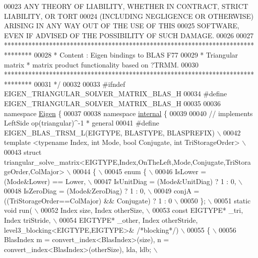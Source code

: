 \begin{DoxyCode}
00023 \textcolor{comment}{ ANY THEORY OF LIABILITY, WHETHER IN CONTRACT, STRICT LIABILITY, OR TORT}
00024 \textcolor{comment}{ (INCLUDING NEGLIGENCE OR OTHERWISE) ARISING IN ANY WAY OUT OF THE USE OF THIS}
00025 \textcolor{comment}{ SOFTWARE, EVEN IF ADVISED OF THE POSSIBILITY OF SUCH DAMAGE.}
00026 \textcolor{comment}{}
00027 \textcolor{comment}{ ********************************************************************************}
00028 \textcolor{comment}{ *   Content : Eigen bindings to BLAS F77}
00029 \textcolor{comment}{ *   Triangular matrix * matrix product functionality based on ?TRMM.}
00030 \textcolor{comment}{ ********************************************************************************}
00031 \textcolor{comment}{*/}
00032 
00033 \textcolor{preprocessor}{#ifndef EIGEN\_TRIANGULAR\_SOLVER\_MATRIX\_BLAS\_H}
00034 \textcolor{preprocessor}{#define EIGEN\_TRIANGULAR\_SOLVER\_MATRIX\_BLAS\_H}
00035 
00036 \textcolor{keyword}{namespace }\hyperlink{namespace_eigen}{Eigen} \{
00037 
00038 \textcolor{keyword}{namespace }\hyperlink{namespaceinternal}{internal} \{
00039 
00040 \textcolor{comment}{// implements LeftSide op(triangular)^-1 * general}
00041 \textcolor{preprocessor}{#define EIGEN\_BLAS\_TRSM\_L(EIGTYPE, BLASTYPE, BLASPREFIX) \(\backslash\)}
00042 \textcolor{preprocessor}{template <typename Index, int Mode, bool Conjugate, int TriStorageOrder> \(\backslash\)}
00043 \textcolor{preprocessor}{struct triangular\_solve\_matrix<EIGTYPE,Index,OnTheLeft,Mode,Conjugate,TriStorageOrder,ColMajor> \(\backslash\)}
00044 \textcolor{preprocessor}{\{ \(\backslash\)}
00045 \textcolor{preprocessor}{  enum \{ \(\backslash\)}
00046 \textcolor{preprocessor}{    IsLower = (Mode&Lower) == Lower, \(\backslash\)}
00047 \textcolor{preprocessor}{    IsUnitDiag  = (Mode&UnitDiag) ? 1 : 0, \(\backslash\)}
00048 \textcolor{preprocessor}{    IsZeroDiag  = (Mode&ZeroDiag) ? 1 : 0, \(\backslash\)}
00049 \textcolor{preprocessor}{    conjA = ((TriStorageOrder==ColMajor) && Conjugate) ? 1 : 0 \(\backslash\)}
00050 \textcolor{preprocessor}{  \}; \(\backslash\)}
00051 \textcolor{preprocessor}{  static void run( \(\backslash\)}
00052 \textcolor{preprocessor}{      Index size, Index otherSize, \(\backslash\)}
00053 \textcolor{preprocessor}{      const EIGTYPE* \_tri, Index triStride, \(\backslash\)}
00054 \textcolor{preprocessor}{      EIGTYPE* \_other, Index otherStride, level3\_blocking<EIGTYPE,EIGTYPE>& }\textcolor{comment}{/*blocking*/}\textcolor{preprocessor}{) \(\backslash\)}
00055 \textcolor{preprocessor}{  \{ \(\backslash\)}
00056 \textcolor{preprocessor}{   BlasIndex m = convert\_index<BlasIndex>(size), n = convert\_index<BlasIndex>(otherSize), lda, ldb; \(\backslash\)}

\end{DoxyCode}
